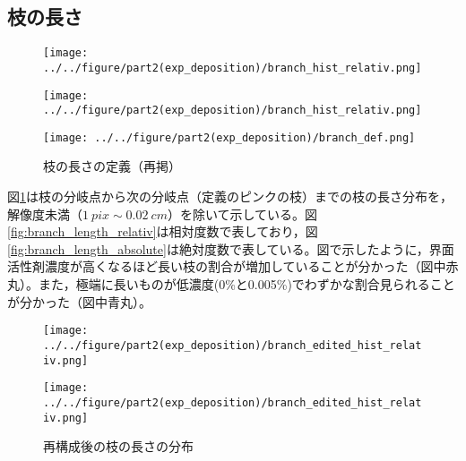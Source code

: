\documentclass[autodetect-engine,dvi=dvipdfmx,a4paper,ja=standard,oneside,openany,11pt,draft]{bxjsbook}
\begin{document}
\subsection{枝の長さ}
\begin{figure}[H]
  \begin{minipage}
    {0.32\textwidth}
    \centering
    \texttt{[image: ../../figure/part2(exp\_deposition)/branch\_hist\_relativ.png]}
    \label{fig:branch_length_relativ}
  \end{minipage}
  \begin{minipage}
    {0.32\textwidth}
    \centering
    \texttt{[image: ../../figure/part2(exp\_deposition)/branch\_hist\_relativ.png]}
    \subcaption{\textcolor{red}{枝の長さ分布(絶対度数)}} %
    \label{fig:branch_length_absolute}
  \end{minipage}
  \begin{minipage}
    {0.32\textwidth}
    \centering
    \texttt{[image: ../../figure/part2(exp\_deposition)/branch\_def.png]}
    \label{fig:branch_def}
  \end{minipage}
  \caption{枝の長さの定義（再掲）}
  \label{fig:branch_length}
\end{figure}
図\ref{fig:branch_length}は枝の分岐点から次の分岐点（定義のピンクの枝）までの枝の長さ分布を，解像度未満（$\SI{1}{pix}\sim \SI{0.02}{cm}$）を除いて示している。図\ref{fig:branch_length_relativ}は相対度数で表しており，図\ref{fig:branch_length_absolute}は絶対度数で表している。図で示したように，界面活性剤濃度が高くなるほど長い枝の割合が増加していることが分かった（図中赤丸）。また，極端に長いものが低濃度(0\%と0.005\%)でわずかな割合見られることが分かった（図中青丸）。
\begin{figure}[H]
  \begin{minipage}
    {0.45\textwidth}
    \centering
    \texttt{[image: ../../figure/part2(exp\_deposition)/branch\_edited\_hist\_relativ.png]}
    \label{fig:branch_length_relativ_edited}
  \end{minipage}
  \begin{minipage}
    {0.45\textwidth}
    \centering
    \texttt{[image: ../../figure/part2(exp\_deposition)/branch\_edited\_hist\_relativ.png]}
    \subcaption{\textcolor{red}{再構成後の枝の長さ分布（絶対度数）}}
    \label{fig:branch_length_absolute_edited}
  \end{minipage}
  \caption{再構成後の枝の長さの分布}
  \label{fig:branch_length_edited}
\end{figure}
\end{document}
